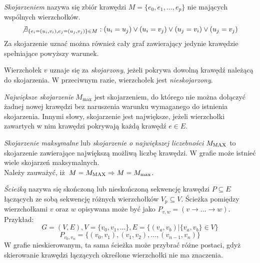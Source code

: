 \begin{definition}
  \emph{Skojarzeniem} nazywa się zbiór krawędzi $M=\{e_0, e_1, \ldots, e_p\}$
  nie mających wspólnych wierzchołków.
  \[\not\exists_{\{e_i=(u_i,v_i), e_j=(u_j, v_j)\} \in M}: (u_i=u_j) \lor (u_i=v_j) \lor (u_j=v_i) \lor (u_j=v_j)\]
  Za skojarzenie uznać można również cały graf zawierający jedynie krawędzie
  spełniające powyższy warunek.
\end{definition}

\begin{definition}
  Wierzchołek $v$ uznaje się za \emph{skojarzony}, jeżeli pokrywa dowolną
  krawędź należącą do skojarzenia.
  W przeciwnym razie, wierzchołek jest \emph{nieskojarzony}.
\end{definition}

\begin{definition}
  \emph{Największe skojarzenie} $M_{\max}$ jest skojarzeniem, do którego nie można
  dołączyć żadnej nowej krawędzi bez naruszenia warunku wymaganego do istnienia
  skojarzenia. 
  Innymi słowy, skojarzenie jest największe, jeżeli wierzchołki zawartych w nim
  krawędzi pokrywają każdą krawędź $e \in E$.
\end{definition}

\begin{definition}
  \emph{Skojarzenie maksymalne} lub \emph{skojarzenie o największej liczebności}
  $M_{\textnormal{MAX}}$ to skojarzenie zawierające największą możliwą liczbę krawędzi.
  W grafie może istnieć wiele skojarzeń maksymalnych.\\
  Należy zauważyć, iż~$M=M_{\textnormal{MAX}} \Rightarrow M=M_{\max}$.
\end{definition}

\begin{definition}
  \emph{Ścieżką} nazywa się skończoną lub nieskończoną sekwencję krawędzi 
  $P \subseteq E$ łączących ze sobą sekwencję różnych wierzchołków
  $V_p \subseteq V$.
  Ścieżka pomiędzy wierzchołkami $v$ oraz $w$ opisywana może być jako $P_{v,w} = (v \rightarrow \ldots \rightarrow w)$.
  Przykład:
  \[G=(V,E), V=\{v_0, v_1, \ldots\}, E=\{(v_a, v_b)| \{v_a, v_b\} \in V\}\]
  \[P_{v_0, v_n}=\{(v_0, v_1), (v_1, v_2), \ldots, (v_{n-1}, v_n)\}\]
  W grafie nieskierowanym, ta sama ścieżka może przybrać różne postaci, gdyż
  skierowanie krawędzi łączących określone wierzchołki nie ma znaczenia.
\end{definition}

